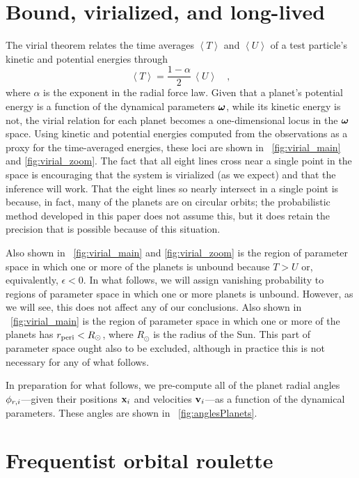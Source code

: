 \section{Bound, virialized, and long-lived}

The virial theorem relates the time averages $\left<T\right>$ and
$\left<U\right>$ of a test particle's kinetic and potential energies
through
\begin{equation}\label{eq:virialtheorem}
\left<T\right> = \frac{1-\alpha}{2}\,\left<U\right> \quad,
\end{equation}
where $\alpha$ is the exponent in the radial force law.  Given that a
planet's potential energy is a function of the dynamical parameters
$\boldsymbol{{\omega}}$, while its kinetic energy is not, the virial relation for
each planet becomes a one-dimensional locus in the $\boldsymbol{{\omega}}$ space.
Using kinetic and potential energies computed from the observations as
a proxy for the time-averaged energies, these loci are shown in
\figurenames~\ref{fig:virial_main} and \ref{fig:virial_zoom}.  The
fact that all eight lines cross near a single point in the space is
encouraging that the system is virialized (as we expect) and that the
inference will work. That the eight lines so nearly intersect in a
single point is because, in fact, many of the planets are on circular
orbits; the probabilistic method developed in this paper does not
assume this, but it does retain the precision that is possible because
of this situation.

Also shown in \figurenames~\ref{fig:virial_main} and
\ref{fig:virial_zoom} is the region of parameter space in which one or
more of the planets is unbound because $T>U$ or, equivalently,
$\epsilon < 0$.  In what follows, we will assign vanishing probability
to regions of parameter space in which one or more planets is
unbound. However, as we will see, this does not affect any of our
conclusions. Also shown in \figurename~\ref{fig:virial_main} is the
region of parameter space in which one or more of the planets has
$r_{\mathrm{peri}}<R_\odot$, where $R_\odot$ is the radius of the Sun.  This part
of parameter space ought also to be excluded, although in practice
this is not necessary for any of what follows.

In preparation for what follows, we pre-compute all of the planet
radial angles $\phi_{r,i}$---given their positions $\boldsymbol{\mathbf{x}}_i$ and
velocities $\boldsymbol{\mathbf{v}}_i$---as a function of the dynamical parameters.  These
angles are shown in \figurename~\ref{fig:anglesPlanets}.

\section{Frequentist orbital roulette}\label{sec:freq}

